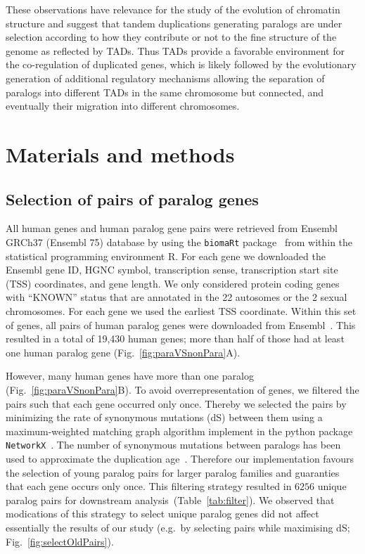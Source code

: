 \documentclass[a4paper,twoside=true,openright,parskip=full,chapterprefix=true,11pt,headings=normal,bibliography=totoc,listof=totoc,titlepage=on,captions=tableabove,draft=false]{scrreprt}
\theoremstyle{definition}
\theoremstyle{definition}
\theoremstyle{definition}
\theoremstyle{remark}
\begin{document}
These observations have relevance for the study of the evolution of
chromatin structure and suggest that tandem duplications generating
paralogs are under selection according to how they contribute or not to
the fine structure of the genome as reflected by TADs. Thus TADs provide
a favorable environment for the co-regulation of duplicated genes, which
is likely followed by the evolutionary generation of additional
regulatory mechanisms allowing the separation of paralogs into different
TADs in the same chromosome but connected, and eventually their
migration into different chromosomes.

\hypertarget{sec:paralog-methods}{%
\section{Materials and methods}\label{sec:paralog-methods}}

\hypertarget{selection-of-pairs-of-paralog-genes}{%
\subsection{Selection of pairs of paralog
genes}\label{selection-of-pairs-of-paralog-genes}}

All human genes and human paralog gene pairs were retrieved from Ensembl
GRCh37 (Ensembl 75) database by using the \texttt{biomaRt}
package~\citep{Durinck2009b, Durinck2005} from within the statistical
programming environment R. For each gene we downloaded the Ensembl gene
ID, HGNC symbol, transcription sense, transcription start site (TSS)
coordinates, and gene length. We only considered protein coding genes
with ``KNOWN'' status that are annotated in the 22 autosomes or the 2
sexual chromosomes. For each gene we used the earliest TSS coordinate.
Within this set of genes, all pairs of human paralog genes were
downloaded from Ensembl~\citep{Vilella2009}. This resulted in a total of
19,430 human genes; more than half of those had at least one human
paralog gene (Fig.~\ref{fig:paraVSnonPara}A).

However, many human genes have more than one paralog
(Fig.~\ref{fig:paraVSnonPara}B). To avoid overrepresentation of genes,
we filtered the pairs such that each gene occurred only once. Thereby we
selected the pairs by minimizing the rate of synonymous mutations (dS)
between them using a maximum-weighted matching graph algorithm implement
in the python package \texttt{NetworkX}~\citep{Galil1986}. The number of
synonymous mutations between paralogs has been used to approximate the
duplication age~\citep{Lan2016}. Therefore our implementation favours
the selection of young paralog pairs for larger paralog families and
guaranties that each gene occurs only once. This filtering strategy
resulted in \(6256\) unique paralog pairs for downstream
analysis~(Table~\ref{tab:filter}). We observed that modications of this
strategy to select unique paralog genes did not affect essentially the
results of our study (e.g.~by selecting pairs while maximising dS;
Fig.~\ref{fig:selectOldPairs}).
\end{document}
